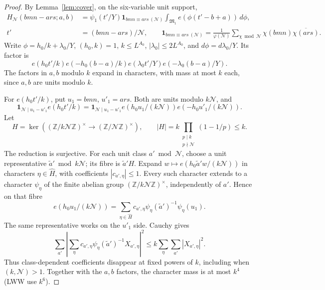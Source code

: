\documentclass[11pt]{article}
\theoremstyle{definition}
\newcommand{\Z}{\mathbb Z}
\newcommand{\ind}{\mathbf 1}
\newcommand{\ph}{\varphi}
\newcommand{\GN}{\mathcal N}
\newcommand{\Mone}{\mathfrak M_1}
\theoremstyle{remark}
\numberwithin{equation}{section}
\begin{document}
\begin{proof}
By Lemma~\ref{lem:cover}, on the six-variable unit support,
\begin{equation}\label{eq:character-congruence}
 \begin{split}
 H_{\GN}(bmn-ars;a,b)
 &=\psi_1(t'/Y)\ind_{bmn\equiv ars\ (\GN)}
      \int_{\Mone}e(\phi(t'-b+a))\,d\phi,\\
 t'&=(bmn-ars)/\GN,\qquad
 \ind_{bmn\equiv ars\ (\GN)}
 =\frac1{\ph(\GN)}\sum_{\chi\bmod\GN}\chi(bmn)\overline{\chi(ars)}.
 \end{split}
\end{equation}
Write $\phi=h_0/k+\lambda_0/Y$,
$(h_0,k)=1$, $k\le L^{A_0}$, $|\lambda_0|\le2L^{A_0}$,
and $d\phi=d\lambda_0/Y$. Its factor is
\begin{equation}\label{eq:arc-phases}
 e(h_0t'/k)e(-h_0(b-a)/k)
 e(\lambda_0t'/Y)e(-\lambda_0(b-a)/Y).
\end{equation}
The factors in $a,b$ modulo $k$ expand in characters, with mass
at most $k$ each, since $a,b$ are units modulo $k$.

For $e(h_0t'/k)$, put $u_1=bmn$, $u'_1=ars$.
Both are units modulo $k\GN$, and
\[
 \ind_{\GN\mid u_1-u'_1}e(h_0t'/k)
 =\ind_{\GN\mid u_1-u'_1}
    e(h_0u_1/(k\GN))e(-h_0u'_1/(k\GN)).
\]
Let
\begin{equation}\label{eq:fibre-group}
 H=\ker((\Z/k\GN\Z)^\times\longrightarrow(\Z/\GN\Z)^\times),
 \qquad |H|=k\prod_{\substack{p\mid k\\p\nmid\GN}}(1-1/p)\le k.
\end{equation}
The reduction is surjective. For each unit class $a'\bmod\GN$,
choose a unit representative $\widetilde a'\bmod k\GN$; its fibre
is $\widetilde a'H$. Expand
$w\mapsto e(h_0\widetilde a'w/(k\GN))$ in characters
$\eta\in\widehat H$, with coefficients $|c_{a',\eta}|\le1$.
Every such character extends to a character $\psi_\eta$ of the
finite abelian group $(\Z/k\GN\Z)^\times$, independently of $a'$.
Hence on that fibre
\begin{equation}\label{eq:fibre-expansion}
 e(h_0u_1/(k\GN))
 =\sum_{\eta\in\widehat H}
 c_{a',\eta}\psi_\eta(\widetilde a')^{-1}\psi_\eta(u_1).
\end{equation}
The same representative works on the $u'_1$ side. Cauchy gives
\begin{equation}\label{eq:fibre-cauchy}
 \sum_{a'}\left|\sum_\eta
 c_{a',\eta}\psi_\eta(\widetilde a')^{-1}X_{a',\eta}\right|^2
 \le k\sum_\eta\sum_{a'}|X_{a',\eta}|^2.
\end{equation}
Thus class-dependent coefficients disappear at fixed powers of
$k$, including when $(k,\GN)>1$. Together with the $a,b$ factors,
the character mass is at most $k^4$ (LWW use $k^6$).


\end{proof}
\end{document}
